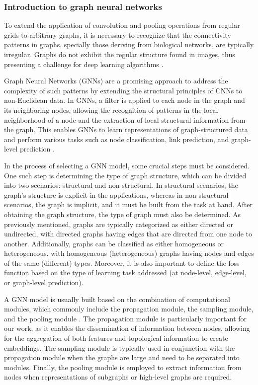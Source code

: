 \subsubsection{Introduction to graph neural networks}
\label{sec:backgroud:gnns}

To extend the application of convolution and pooling operations from regular grids to arbitrary graphs, it is necessary to recognize that the connectivity patterns in graphs, specially those deriving from biological networks, are typically irregular. Graphs do not exhibit the regular structure found in images, thus presenting a challenge for deep learning algorithms \cite{chen2020simple}.


Graph Neural Networks (GNNs) are a promising approach to address the complexity of such patterns by extending the structural principles of CNNs to non-Euclidean data. In GNNs, a filter is applied to each node in the graph and its neighboring nodes, allowing the recognition of patterns in the local neighborhood of a node and the extraction of local structural information from the graph. This enables GNNs to learn representations of graph-structured data and perform various tasks such as node classification, link prediction, and graph-level prediction \cite{zhang2019graph}.

In the process of selecting a GNN model, some crucial steps must be considered. One such step is determining the type of graph structure, which can be divided into two scenarios: structural and non-structural. In structural scenarios, the graph's structure is explicit in the applications, whereas in non-structural scenarios, the graph is implicit, and it must be built from the task at hand. After obtaining the graph structure, the type of graph must also be determined. As previously mentioned, graphs are typically categorized as either directed or undirected, with directed graphs having edges that are directed from one node to another. Additionally, graphs can be classified as either homogeneous or heterogeneous, with homogeneous (heterogeneous) graphs having nodes and edges of the same (different) types. Moreover, it is also important to define the loss function based on the type of learning task addressed (\ie at node-level, edge-level, or graph-level prediction).



A GNN model is usually built based on the combination of computational modules, which commonly include the propagation module, the sampling module, and the pooling module \cite{zhou2020graph, georgousis2021graph}. The propagation module is particularly important for our work, as it enables the dissemination of information between nodes, allowing for the aggregation of both features and topological information to create embeddings. The sampling module is typically used in conjunction with the propagation module when the graphs are large and need to be separated into modules. Finally, the pooling module is employed to extract information from nodes when representations of subgraphs or high-level graphs are required.


